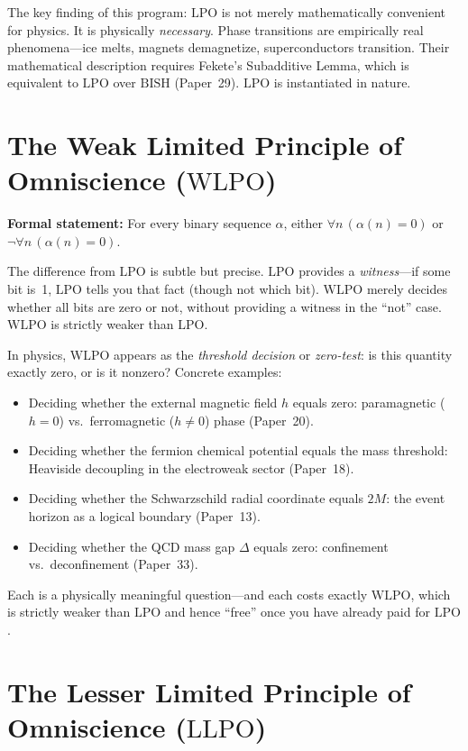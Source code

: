 \documentclass[11pt,a4paper]{report}
\theoremstyle{plain}
\theoremstyle{definition}
\theoremstyle{remark}
\newcommand{\BISH}{\mathrm{BISH}}
\newcommand{\LLPO}{\mathrm{LLPO}}
\newcommand{\WLPO}{\mathrm{WLPO}}
\newcommand{\LPO}{\mathrm{LPO}}
\begin{document}
The key finding of this program: $\LPO$ is not merely mathematically convenient for physics. It is physically \emph{necessary}. Phase transitions are empirically real phenomena---ice melts, magnets demagnetize, superconductors transition. Their mathematical description requires Fekete's Subadditive Lemma, which is equivalent to $\LPO$ over $\BISH$ (Paper~29). $\LPO$ is instantiated in nature.

\section{The Weak Limited Principle of Omniscience ($\WLPO$)}

\textbf{Formal statement:} For every binary sequence $\alpha$, either $\forall n\, (\alpha(n)=0)$ or $\neg\forall n\, (\alpha(n)=0)$.

The difference from $\LPO$ is subtle but precise. $\LPO$ provides a \emph{witness}---if some bit is~1, $\LPO$ tells you that fact (though not which bit). $\WLPO$ merely decides whether all bits are zero or not, without providing a witness in the ``not'' case. $\WLPO$ is strictly weaker than $\LPO$.

In physics, $\WLPO$ appears as the \emph{threshold decision} or \emph{zero-test}: is this quantity exactly zero, or is it nonzero? Concrete examples:
\begin{itemize}[nosep]
\item Deciding whether the external magnetic field $h$ equals zero: paramagnetic ($h=0$) vs.\ ferromagnetic ($h \neq 0$) phase (Paper~20).
\item Deciding whether the fermion chemical potential equals the mass threshold: Heaviside decoupling in the electroweak sector (Paper~18).
\item Deciding whether the Schwarzschild radial coordinate equals $2M$: the event horizon as a logical boundary (Paper~13).
\item Deciding whether the QCD mass gap $\Delta$ equals zero: confinement vs.\ deconfinement (Paper~33).
\end{itemize}
Each is a physically meaningful question---and each costs exactly $\WLPO$, which is strictly weaker than $\LPO$ and hence ``free'' once you have already paid for $\LPO$.

\section{The Lesser Limited Principle of Omniscience ($\LLPO$)}
\end{document}
